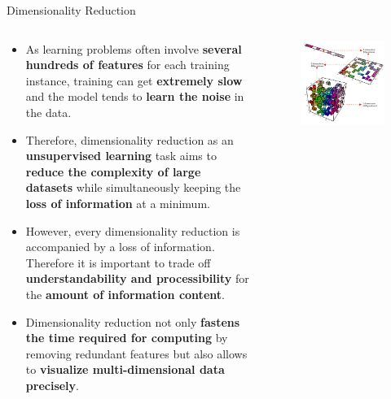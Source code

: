 \documentclass[main.tex]{subfiles}
\begin{document}
    \begin{frame}{Dimensionality Reduction}
        \begin{columns}
            \begin{column}{.6\textwidth}
                \begin{itemize}
                    \item As learning problems often involve \textbf{several hundreds of features} for each training instance, training can get \textbf{extremely slow} and the model tends to \textbf{learn the noise} in the data.
                    \item Therefore, dimensionality reduction as an \textbf{unsupervised learning} task aims to \textbf{reduce the complexity of large datasets} while simultaneously keeping the \textbf{loss of information} at a minimum.  
                    \item However, every dimensionality reduction is accompanied by a loss of information. Therefore it is important to trade off \textbf{understandability and processibility} for the \textbf{amount of information content}.
                    \item Dimensionality reduction not only \textbf{fastens the time required for computing} by removing redundant features but also allows to \textbf{visualize multi-dimensional data precisely}.
                \end{itemize}
            \end{column}
            \begin{column}{.4\textwidth}
                \begin{figure}
                    \label{fig:dimensionality-reduction-task}
                    \includegraphics[width=.8\textwidth, cframe=gray]{figures/external/dimensionality-reduction.png}
                \end{figure}
            \end{column}
        \end{columns}
    \end{frame}
\end{document}
